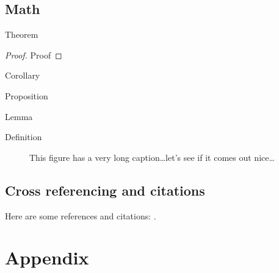 \documentclass[italian,english,counters by chapter]{uniud}
\begin{document}
\section{Math}

\begin{theorem}
	\label{thm:first}
	Theorem
\end{theorem}

\begin{proof}
	Proof
\end{proof}

\begin{corollary}
	\label{cor:first}
	Corollary
\end{corollary}

\begin{proposition}
	\label{prop:first}
	Proposition
\end{proposition}

\begin{lemma}
	\label{lem:first}
	Lemma
\end{lemma}

\begin{definition}
	\label{def:first}
	Definition
\end{definition}

\begin{remark}
	\label{rem:first}
	\blindtext[1]
\end{remark}

\begin{figure}[t]
	\begin{center}
	\end{center}
	\caption{This figure has a very long caption\dots let's see if it comes out nice\dots}
	\label{fig:first}
\end{figure}

\section{Cross referencing and citations}

Here are some references and citations:   \cite{article,book,booklet,conference,inbook,incollection,manual,mastersthesis,misc,phdthesis,proceedings,techreport,unpublished}.





\printbibliography

\appendix

\chapter{Appendix}
\lipsum[1-7]
\end{document}
